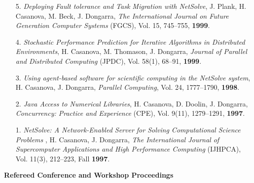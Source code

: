 \begin{enumerate}
\item[5.]
{\it Deploying Fault tolerance and Task Migration with NetSolve},
J. Plank, H. Casanova, M. Beck, J. Dongarra, \emph{The International
Journal on Future Generation Computer Systems} (FGCS), Vol. 15, 745--755,
{\bf 1999}.

\item[4.]
{\it Stochastic Performance Prediction for Iterative Algorithms in
Distributed Environments}, H. Casanova, M. Thomason, J. Dongarra,
\emph{Journal of Parallel and Distributed Computing} (JPDC), Vol. 58(1),
68--91, {\bf 1999}.

\item[3.]
{\it Using agent-based software for scientific computing in the NetSolve
system}, H. Casanova, J. Dongarra, \emph{Parallel Computing}, Vol. 24,
1777--1790, {\bf 1998}.

\item[2.]
{\it Java Access to Numerical Libraries}, H. Casanova, D. Doolin,
J. Dongarra, \emph{Concurrency: Practice and Experience} (CPE), Vol. 9(11),
1279--1291, {\bf 1997}.

\item[1.]
{\it NetSolve: A Network-Enabled Server for Solving Computational
Science Problems }, H. Casanova, J. Dongarra, {\em The International
Journal of Supercomputer Applications and High Performance Computing}
(IJHPCA), Vol. 11(3), 212--223, Fall {\bf 1997}. 

\end{enumerate}

\noindent
{\bf Refereed Conference and Workshop Proceedings}

